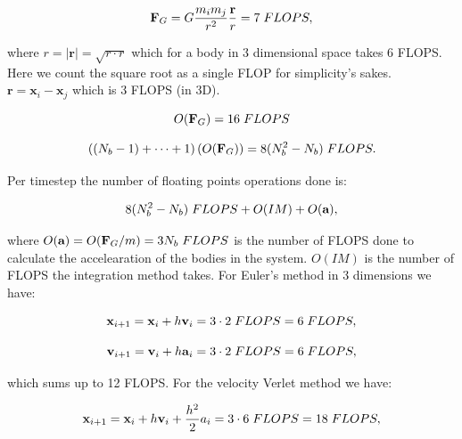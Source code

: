 \documentclass[a4paper, fontsize=11pt]{article}
\begin{document}
\begin{equation}
\textbf{F}_{G} = G\frac{m_i m_j}{r^2} \frac{\textbf{r}}{r} = 7 \hspace{1mm} FLOPS,
\end{equation}

where $r = |\textbf{r}| = \sqrt{r \cdot r}$ which for a body in 3 dimensional space takes 6 FLOPS. Here we count the square root as a single FLOP for simplicity's sakes.  $\textbf{r} = \textbf{x}_i - \textbf{x}_j$ which is 3 FLOPS (in 3D). 

\begin{equation}
O(\textbf{F}_{G}) = 16 \hspace{1mm} FLOPS
\end{equation}

\begin{equation}
\left((N_b  - 1) + \cdots + 1\right)(O(\textbf{F}_{G})) = 8(N_b^2 - N_b) \hspace{1mm} FLOPS.
\end{equation}


Per timestep the number of floating points operations done is:

\begin{equation}
8(N_b^2 - N_b) \hspace{1mm}  FLOPS + O(IM) + O(\textbf{a}),
\end{equation}

where $O(\textbf{a}) = O(\textbf{F}_{G} / m) = 3N_b \hspace{1mm} FLOPS$ is the number of FLOPS done to calculate the accelearation of the bodies in the system. $O(IM)$ is the number of FLOPS the integration method takes. For Euler's method in 3 dimensions we have:

\begin{equation}
\textbf{x}_{i + 1} = \textbf{x}_i + h \textbf{v}_i = 3 \cdot 2 \hspace{1mm} FLOPS = 6 \hspace{1mm} FLOPS,
\end{equation}

\begin{equation}
\textbf{v}_{i + 1} = \textbf{v}_i + h \textbf{a}_i = 3 \cdot 2 \hspace{1mm}  FLOPS = 6 \hspace{1mm} FLOPS,
\end{equation}

which sums up to 12 FLOPS. For the velocity Verlet method we have:

\begin{equation}
\textbf{x}_{i + 1} = \textbf{x}_i + h \textbf{v}_i + \frac{h^2}{2}a_i = 3 \cdot 6 \hspace{1mm} FLOPS = 18 \hspace{1mm} FLOPS,
\end{equation}
\end{document}
